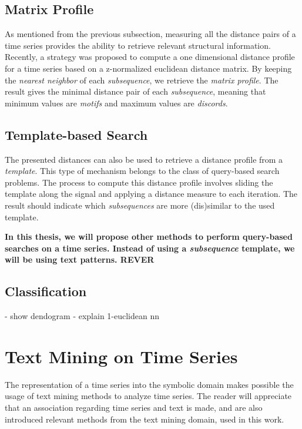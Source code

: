 \subsection{Matrix Profile}
\label{subsec:matrixprofile}

As mentioned from the previous subsection, measuring all the distance pairs of a time series provides the ability to retrieve relevant structural information. Recently, a strategy was proposed to compute a one dimensional distance profile for a time series based on a z-normalized euclidean distance matrix. By keeping the \textit{nearest neighbor} of each \textit{subsequence}, we retrieve the \textit{matrix profile}. The result gives the minimal distance pair of each \textit{subsequence}, meaning that minimum values are \textit{motifs} and maximum values are \textit{discords}.
\par


\subsection{Template-based Search}
\label{sec:query_based_search}

The presented distances can also be used to retrieve a distance profile from a \textit{template}. This type of mechanism belongs to the class of query-based search problems. The process to compute this distance profile involves sliding the template along the signal and applying a distance measure to each iteration. The result should indicate which \textit{subsequences} are more (dis)similar to the used template.
\par


\textbf{In this thesis, we will propose other methods to perform query-based searches on a time series. Instead of using a \textit{subsequence} template, we will be using text patterns. REVER}

\subsection{Classification}

- show dendogram
- explain 1-euclidean nn

\section{Text Mining on Time Series}
\label{sec:text_time}

The representation of a time series into the symbolic domain makes possible the usage of text mining methods to analyze time series. The reader will appreciate that an association regarding time series and text is made, and are also introduced relevant methods from the text mining domain, used in this work.

